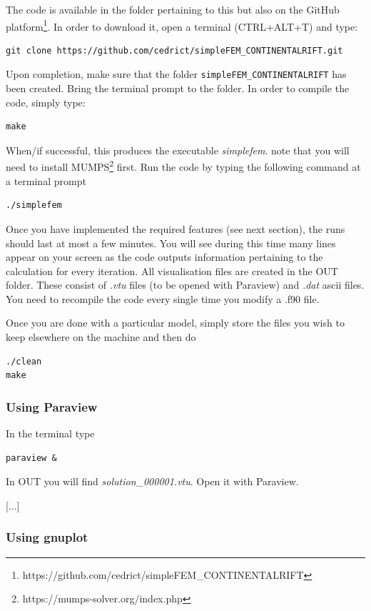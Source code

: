 The code is available in the folder pertaining to this \stone but also 
on the GitHub platform\footnote{https://github.com/cedrict/simpleFEM\_CONTINENTALRIFT}. 
In order to download it, open a terminal (CTRL+ALT+T) and type:
\begin{verbatim}
git clone https://github.com/cedrict/simpleFEM_CONTINENTALRIFT.git
\end{verbatim}
Upon completion, make sure that the folder {\tt simpleFEM\_CONTINENTALRIFT} has been created. Bring the 
terminal prompt to the folder.
In order to compile the code, simply type:
\begin{verbatim}
make
\end{verbatim}
When/if successful, this produces the executable {\sl simplefem}.
{\color{red} note that you will need to install MUMPS\footnote{https://mumps-solver.org/index.php} first.}
Run the code by typing the following command at a terminal prompt 
\begin{verbatim}
./simplefem
\end{verbatim}

Once you have implemented the required features (see next section), the runs should last at most a few minutes. 
You will see during this time many lines appear
on your screen as the code outputs information pertaining to the calculation for every iteration.
All visualisation files are created in the OUT folder. These consist of {\sl .vtu} files (to be opened with Paraview) and {\sl .dat} ascii files. 
You need to recompile the code every single time you modify a .f90 file.

Once you are done with a particular model, simply store the files you wish to keep elsewhere on the machine and then do
\begin{verbatim}
./clean
make
\end{verbatim}


\subsubsection*{Using Paraview}

In the terminal type
\begin{verbatim}
paraview &
\end{verbatim}
In OUT you will find {\sl solution\_000001.vtu}. Open it with Paraview.

[...]

\subsubsection*{Using gnuplot}

